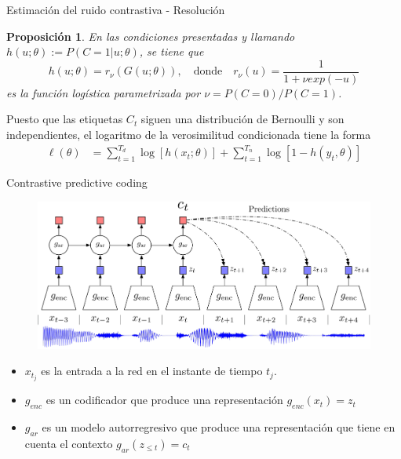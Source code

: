 \documentclass[aspectratio=169]{beamer}
\newtheorem{prop}{Proposición}
\begin{document}
  \begin{frame}{Estimación del ruido contrastiva - Resolución}
  
    \begin{prop}
      En las condiciones presentadas y llamando \(h(u;\theta) := P(C = 1|u ; \theta)\), se tiene que 
      \[
      h(u;\theta) = r_\nu(G(u;\theta)), \quad \text{donde} \quad  r_\nu(u) = \frac{1}{1 + \nu exp(-u)}
      \]
      es la función logística parametrizada por \(\nu = P(C = 0)/P(C=1)\).
      \end{prop}
     
      \pause
      Puesto que las etiquetas \(C_t\) siguen una distribución de Bernoulli y son independientes, el logaritmo de la verosimilitud condicionada tiene la forma
      \begin{align*}
        \ell(\theta) & =  %
        \sum_{t = 1}^{T_d} \log [h(x_t;\theta)] + \sum_{t = 1}^{T_n} \log[1- h(y_t,\theta)]  
      \end{align*}

  \end{frame}
  \begin{frame}{Contrastive predictive coding}


    \begin{figure}
      \centering
      \includegraphics[scale=0.38]{contrastive_repr4.pdf}
    \end{figure}

    \begin{itemize}
      \item \(x_{t_j}\) es la entrada a la red en el instante de tiempo \(t_j\).
      \item \(g_{enc}\) es un codificador que produce una representación \(g_{enc}(x_t) = z_t\)
      \item \(g_{ar}\) es un modelo autorregresivo que produce una representación que tiene en cuenta el contexto \(g_{ar}(z_{\leq t})= c_t\)
    \end{itemize}

      

  
  \end{frame}
\end{document}
